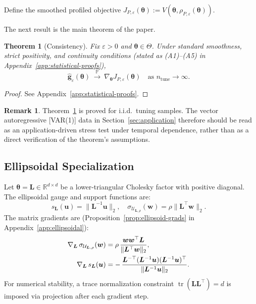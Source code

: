 \documentclass[11pt]{article}
\newcommand{\R}{\mathbb{R}}
\newcommand{\Prob}{\mathbb{P}}
\newcommand{\cU}{\mathcal{U}}
\newcommand{\norm}[1]{\|#1\|}
\newcommand{\btheta}{\bm{\theta}}
\newcommand{\bu}{\bm{u}}
\newcommand{\bw}{\bm{w}}
\newcommand{\bL}{\bm{L}}
\newcommand{\bg}{\bm{g}}
\DeclareMathOperator{\tr}{tr}
\newtheorem{theorem}{Theorem}
\theoremstyle{definition}
\newtheorem{remark}{Remark}
\begin{document}
Define the smoothed profiled objective $J_{P,\varepsilon}(\btheta):=V(\btheta,\rho_{P,\varepsilon}(\btheta))$.

The next result is the main theorem of the paper.

\begin{theorem}[Consistency]\label{thm:consistency-eps}
Fix $\varepsilon>0$ and $\btheta\in\Theta$. Under standard smoothness, strict positivity, and continuity conditions (stated as (A1)--(A5) in Appendix~\ref{app:statistical-proofs}),
\[
\hat{\bg}_\varepsilon(\btheta)\ \xrightarrow{\ \Prob\ }\ \nabla_{\btheta}J_{P,\varepsilon}(\btheta) \quad \text{as } n_{\mathrm{tune}}\to\infty.
\]
\end{theorem}

\begin{proof}
See Appendix~\ref{app:statistical-proofs}.
\end{proof}

\begin{remark}
Theorem~\ref{thm:consistency-eps} is proved for i.i.d.\ tuning samples. The vector autoregressive [VAR(1)] data in Section~\ref{sec:application} therefore should be read as an application-driven stress test under temporal dependence, rather than as a direct verification of the theorem's assumptions.
\end{remark}

\subsection{Ellipsoidal Specialization}

Let $\btheta = \bL \in \R^{d \times d}$ be a lower-triangular Cholesky factor with positive diagonal. The ellipsoidal gauge and support functions are:
\begin{equation}
s_{\bL}(\bu) = \norm{\bL^{-1} \bu}_2, \quad
\sigma_{\cU_{\bL,\rho}}(\bw) = \rho \norm{\bL^\top \bw}_2.
\end{equation}
The matrix gradients are (Proposition~\ref{prop:ellipsoid-grads} in Appendix~\ref{app:ellipsoidal}):
\begin{align}\label{eq:grad-sigma-L}
\nabla_{\bL}\,\sigma_{\cU_{\bL,\rho}}(\bw) &= \rho\,\frac{\bw\bw^\top\bL}{\|\bL^\top\bw\|_2}, \\
\nabla_{\bL}\,s_{\bL}(\bu) &= -\,\frac{\bL^{-\top}(\bL^{-1}\bu)(\bL^{-1}\bu)^\top}{\|\bL^{-1}\bu\|_2}. \notag
\end{align}
For numerical stability, a trace normalization constraint $\tr(\bL\bL^\top) = d$ is imposed via projection after each gradient step.
\end{document}
